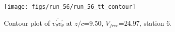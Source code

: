 \begin{figure}[H]
\centering
\texttt{[image: figs/run\_56/run\_56\_tt\_contour]}
\caption{Contour plot of $\overline{v_{\theta}^{\prime} v_{\theta}^{\prime}}$ at $z/c$=9.50, $V_{free}$=24.97, station 6.}
\label{fig:run_56_tt_contour}
\end{figure}


